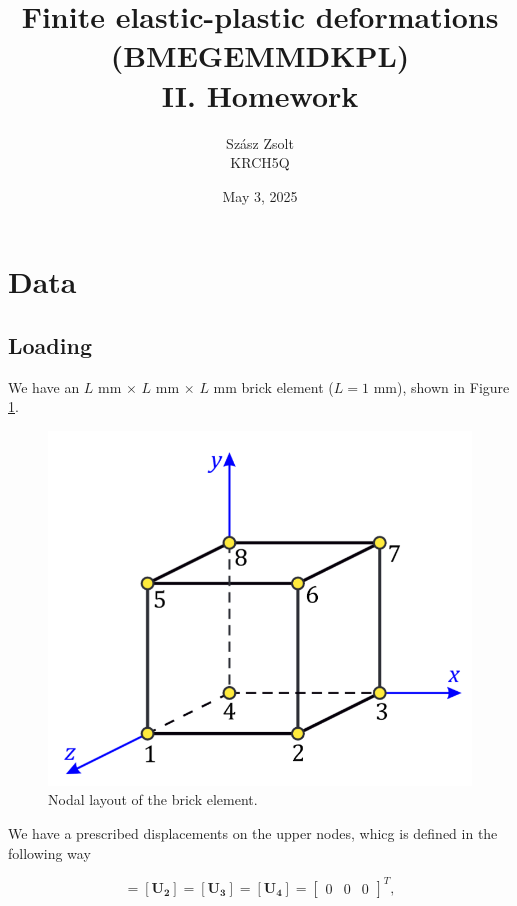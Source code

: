 \documentclass[12pt,a4paper]{article}
\title{Finite elastic-plastic deformations\\(BMEGEMMDKPL)\\II. Homework}
\author{Szász Zsolt\\KRCH5Q}
\date{May 3, 2025}
\begin{document}
\maketitle{}
\newpage

\section{Data}

\subsection*{Loading}

We have  an $L$ mm $\times$ $L$ mm $\times$ $L$ mm brick element ($L=1$ mm), shown in Figure \ref{fig:cube}.

\begin{figure}[h]
    \centering
    \includegraphics[scale=0.5]{figures/cube.png}
    \caption{Nodal layout of the brick element.}
    \label{fig:cube}
\end{figure}

We have a prescribed displacements on the upper nodes, whicg is defined in the following way

\begin{equation}
    [\boldsymbol{U_1}] = [\boldsymbol{U_2}] = [\boldsymbol{U_3}] = [\boldsymbol{U_4}] = \begin{bmatrix} 0 & 0 & 0 \end{bmatrix}^T,
\end{equation}
\end{document}
